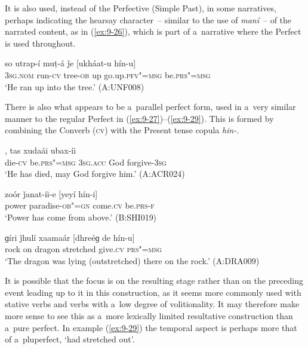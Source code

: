 It is also used, instead of the Perfective (Simple Past), in some narratives, perhaps indicating the hearsay character~-- similar to the use of \textit{maní}~-- of the narrated content, as in (\ref{ex:9-26}), which is part of a~narrative where the Perfect is used throughout.

\begin{exe}
\ex
\label{ex:9-26}
\gll so utrap-í muṭ-á ǰe [ukháat-u hín-u] \\
\textsc{3sg.nom} run-\textsc{cv} tree-\textsc{ob} up go.up.\textsc{pfv"=msg} be.\textsc{prs"=msg} \\
\glt `He ran up into the tree.' (A:UNF008) 
\end{exe}

There is also what appears to be a~parallel perfect form, used in a~very similar manner to the regular Perfect in (\ref{ex:9-27})--(\ref{ex:9-29}). This is formed by combining the Converb (\textsc{cv}) with the Present tense copula \textit{hin-}.

\begin{exe}
\ex
\label{ex:9-27}
, tas xudaái ubax-íi \\
die-\textsc{cv} be.\textsc{prs"=msg} \textsc{3sg.acc} God forgive-\textsc{3sg} \\
\glt `He has died, may God forgive him.' (A:ACR024)

\ex
\label{ex:9-28}
\gll zoór ǰanat-íi-e [yeyí hín-i] \\
power paradise-\textsc{ob"=gn} come.\textsc{cv} be.\textsc{prs-f} \\
\glt `Power has come from above.' (B:SHI019)

\ex
\label{ex:9-29}
\gll ɡíri ǰhulí xaamaár [dhreéɡ de hín-u] \\
rock on dragon stretched give.\textsc{cv} \textsc{prs"=msg} \\
\glt `The dragon was lying (outstretched) there on the rock.' (A:DRA009)
\end{exe}

It is possible that the focus is on the resulting stage rather than on the preceding event leading up to it in this construction, as it seems more commonly used with stative verbs and verbs with a~low degree of volitionality. It may therefore make more sense to see this as a~more lexically limited resultative construction \citep[135]{dahl1985} than a~pure perfect. In example (\ref{ex:9-29}) the temporal aspect is perhaps more that of a~pluperfect, `had stretched out'. 



